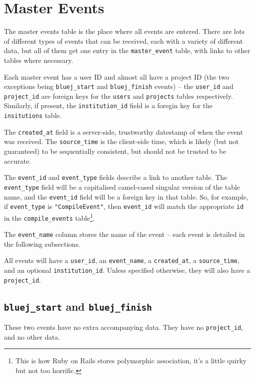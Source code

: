 \documentclass{book}
\begin{document}
\section{Master Events}
\label{tab:master_events}

The master events table is the place where all events are entered.  There are
lots of different types of events that can be received, each with a variety of
different data, but all of them get one entry in the \texttt{master\_event}
table, with links to other tables where necessary.

Each master event has a user ID and almost all have a project ID (the two
exceptions being \texttt{bluej\_start} and \texttt{bluej\_finish} events) -- the
\texttt{user\_id} and \texttt{project\_id} are foreign keys for the
\texttt{users} and \texttt{projects} tables respectively.  Similarly, if
present, the \texttt{institution\_id} field is a foregin key for the
\texttt{insitutions} table.

The \texttt{created\_at} field is a server-side, trustworthy datestamp of when
the event was received.  The \texttt{source\_time} is the client-side time,
which is likely (but not guaranteed) to be sequentially consistent, but should
not be trusted to be accurate.

The \texttt{event\_id} and \texttt{event\_type} fields describe a link to
another table.  The \texttt{event\_type} field will be a capitalised
camel-cased singular version of the table name, and the \texttt{event\_id} field will
be a foreign key in that table.  So, for example, if \texttt{event\_type} is
\texttt{"CompileEvent"}, then \texttt{event\_id} will match the appropriate
\texttt{id} in the \texttt{compile\_events} table\footnote{This is how Ruby on
  Rails stores polymorphic association, it's a little quirky but not too
  horrific.}.

The \texttt{event\_name} column stores the name of the event -- each event is
detailed in the following subsections.

All events will have a \texttt{user\_id}, an \texttt{event\_name}, a
\texttt{created\_at}, a \texttt{source\_time},
and an optional
\texttt{institution\_id}.  Unless specified otherwise, they will also have a \texttt{project\_id}.

\subsection{\texttt{bluej\_start} and \texttt{bluej_finish}}

These two events have no extra accompanying data.  They have no
\texttt{project\_id}, and no other data.
\end{document}
